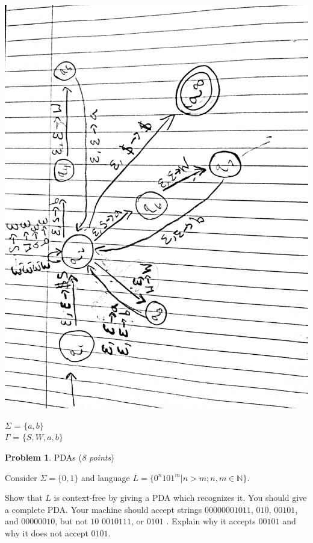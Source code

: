 \documentclass[11pt]{article}
\theoremstyle{definition}
\theoremstyle{theorem}
\newtheorem{prob}{Problem}
\newcommand{\solution}{\medskip\noindent{\color{blue}\textbf{Solution:}}}
\begin{document}
\begin{enumerate}[label=(\alph*)]
\begin{enumerate}[label=(\alph*)]
\solution

\includegraphics[angle=270,origin=c, scale=0.12]{./p2/hw3q2b.jpg}

$\Sigma$ = $\{a, b\}$ \\
$\Gamma$ = $\{S, W, a, b\}$ 






\end{enumerate}


\newpage

\begin{prob} PDAs (\emph{8 points})\end{prob}

Consider $\Sigma = \{0,1\}$ and language $L = \{0^n101^m | n > m; n, m \in \mathbb{N}\}$.

Show that $L$ is context-free by giving a PDA which recognizes it.
You should give a complete PDA. Your machine should accept strings $00000001011$, $010$, $00101$, and $00000010$, but not $10$ $0010111$, or $0101$ . Explain why it accepts $00101$ and why it does not accept $0101$.


\end{enumerate}
\end{document}

